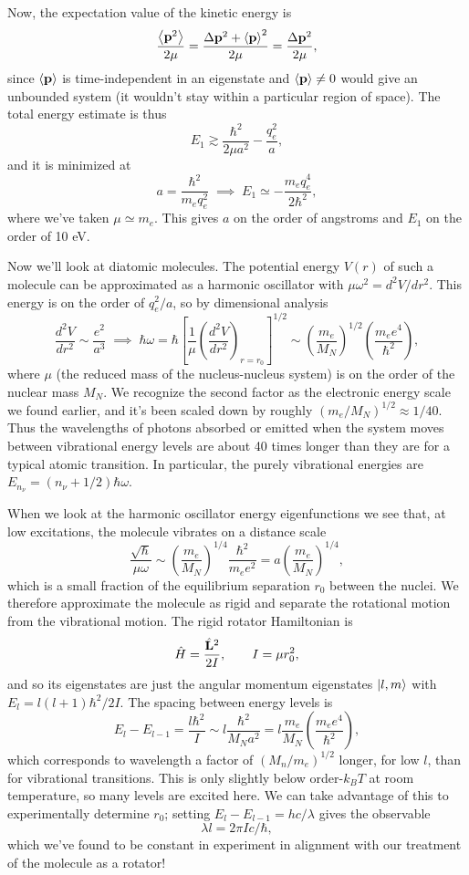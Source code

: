 \documentclass[../p116main.tex]{subfiles}
\begin{document}
Now, the expectation value of the kinetic energy is
\[ \frac{\left< \mathbf{p}^2 \right>}{2\mu} = \frac{\Delta \mathbf{p}^2 + \left< \mathbf{p} \right>^2}{2\mu} = \frac{\Delta \mathbf{p}^2}{2\mu}, \]
since $\left< \mathbf{p} \right>$ is time-independent in an eigenstate and $\left< \mathbf{p} \right> \neq 0$ would give an unbounded system (it wouldn't stay within a particular region of space).
The total energy estimate is thus
\[ E_1 \gtrsim \frac{\hbar^2}{2\mu a^2} - \frac{q_e^2}{a}, \]
and it is minimized at
\[ a = \frac{\hbar^2}{m_e q_e^2} \;\implies\; E_1 \simeq -\frac{m_e q_e^{4}}{2\hbar^2}, \]
where we've taken $\mu \simeq m_e$.
This gives $a$ on the order of angstroms and $E_1$ on the order of 10 eV.

Now we'll look at diatomic molecules.
The potential energy $V(r)$ of such a molecule can be approximated as a harmonic oscillator with $\mu \omega^2 = d^2 V / dr^2$.
This energy is on the order of $q_e^2 / a$, so by dimensional analysis
\[ \frac{d^2 V}{dr^2} \sim \frac{e^2}{a^3} \;\implies\; \hbar \omega = \hbar \left[ \frac{1}{\mu} \left( \frac{d^2 V}{dr^2} \right)_{r = r_0} \right]^{1 / 2} \sim \left( \frac{m_e}{M_N} \right)^{1 / 2} \left( \frac{m_e e^{4}}{\hbar^2} \right), \]
where $\mu$ (the reduced mass of the nucleus-nucleus system) is on the order of the nuclear mass $M_N$.
We recognize the second factor as the electronic energy scale we found earlier, and it's been scaled down by roughly $(m_e / M_N)^{1 / 2} \approx 1 / 40$.
Thus the wavelengths of photons absorbed or emitted when the system moves between vibrational energy levels are about 40 times longer than they are for a typical atomic transition.
In particular, the purely vibrational energies are $E_{n_\nu} = (n_\nu + 1 / 2) \hbar \omega$.

When we look at the harmonic oscillator energy eigenfunctions we see that, at low excitations, the molecule vibrates on a distance scale
\[ \frac{\sqrt{\hbar}}{\mu \omega} \sim \left( \frac{m_e}{M_N} \right)^{1 / 4} \frac{\hbar^2}{m_e e^2} = a \left( \frac{m_e}{M_N} \right)^{1 / 4}, \]
which is a small fraction of the equilibrium separation $r_0$ between the nuclei.
We therefore approximate the molecule as rigid and separate the rotational motion from the vibrational motion.
The rigid rotator Hamiltonian is    \vspace{-4pt}
\[ \hat H = \frac{\hat{\mathbf{L}}^2}{2I}, \qquad I = \mu r_0^2, \]
and so its eigenstates are just the angular momentum eigenstates $\left| l,m \right>$ with $E_l = l(l+1)\hbar^2 / 2I$.
The spacing between energy levels is
\[ E_l - E_{l-1} = \frac{l\hbar^2}{I} \sim l \frac{\hbar^2}{M_N a^2} = l \frac{m_e}{M_N} \left( \frac{m_e e^{4}}{\hbar^2} \right), \]
which corresponds to wavelength a factor of $(M_n / m_e)^{1 / 2}$ longer, for low $l$, than for vibrational transitions.
This is only slightly below order-$k_B T$ at room temperature, so many levels are excited here.
We can take advantage of this to experimentally determine $r_0$; setting $E_l - E_{l-1} = hc / \lambda$ gives the observable
\[ \lambda l = 2\pi I c / \hbar, \]
which we've found to be constant in experiment in alignment with our treatment of the molecule as a rotator!
\end{document}
